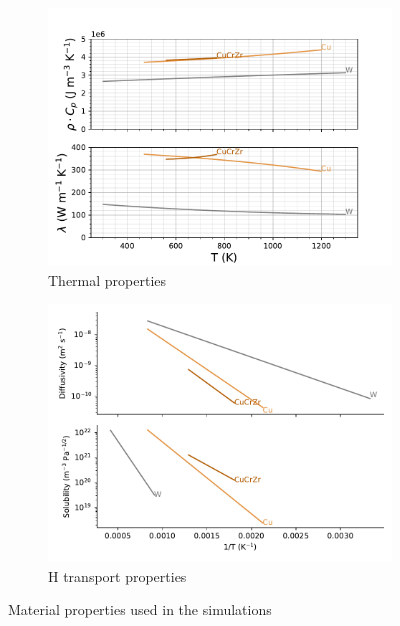 \begin{figure}
    \centering
    \begin{subfigure}{\linewidth}
        \centering
        \includegraphics[width=\linewidth]{Figures/Chapter3/monoblocks/interface_condition/iter case/thermal_prop.pdf}
        \caption{Thermal properties}
    \end{subfigure}
    \begin{subfigure}{\linewidth}
        \centering
        \includegraphics[width=\linewidth]{Figures/Chapter3/monoblocks/monoblock_H_transport_properties.pdf}
        \caption{H transport properties}
    \end{subfigure}
    \caption{Material properties used in the simulations \cite{frauenfelder_solution_1969, reiter_compilation_1996, serra_hydrogen_1998, aiello_hydrogen_2002}}
    \label{fig:properties monoblock}
\end{figure}

